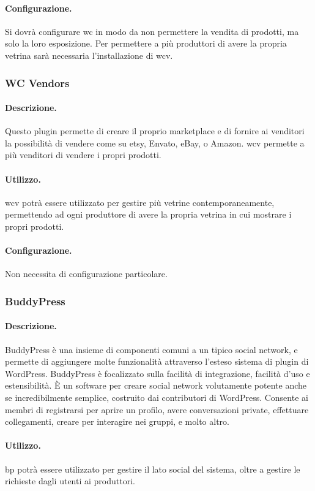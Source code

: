 \paragraph{Configurazione.} Si dovrà configurare \gls{wc} in modo da non permettere la vendita di prodotti, ma solo la loro esposizione.
Per permettere a più produttori di avere la propria vetrina sarà necessaria l'installazione di \gls{wcv}.

\subsubsection{WC Vendors}
\paragraph{Descrizione.} Questo plugin permette di creare il proprio marketplace e di fornire ai venditori la possibilità di vendere come su etsy, Envato, eBay, o Amazon. \gls{wcv} permette a più venditori di vendere i propri prodotti.
\paragraph{Utilizzo.} \gls{wcv} potrà essere utilizzato per gestire più vetrine contemporaneamente, permettendo ad ogni produttore di avere la propria vetrina in cui mostrare i propri prodotti.
\paragraph{Configurazione.} Non necessita di configurazione particolare.

\subsubsection{BuddyPress}
\paragraph{Descrizione.}
BuddyPress è una insieme di componenti comuni a un tipico social network, e permette di aggiungere molte funzionalità attraverso l'esteso sistema di plugin di WordPress.
BuddyPress è focalizzato sulla facilità di integrazione, facilità d'uso e estensibilità. È un software per creare social network volutamente potente anche se incredibilmente semplice, costruito dai contributori di WordPress.
Consente ai membri di registrarsi per aprire un profilo, avere conversazioni private, effettuare collegamenti, creare per interagire nei gruppi, e molto altro. 
\paragraph{Utilizzo.}
\gls{bp} potrà essere utilizzato per gestire il lato social del sistema, oltre a gestire le richieste dagli utenti ai produttori.
